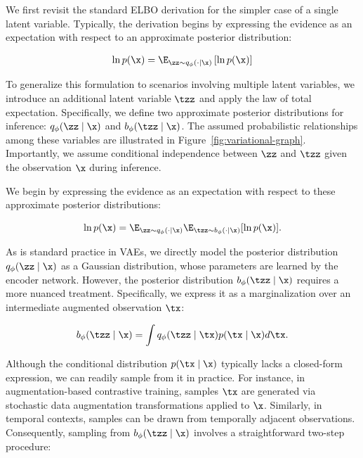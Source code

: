 We first revisit the standard ELBO derivation for the simpler case of a single latent variable. Typically, the derivation begins by expressing the evidence as an expectation with respect to an approximate posterior distribution:

\begin{equation}
    \begin{split}
        \ln{p(\x)}
        & =
        \E_{\zz \sim q_{\phi}(\cdot \mid \x)}
        \left[
            \ln p(\x)
            \right] \\
    \end{split}
\end{equation}

To generalize this formulation to scenarios involving multiple latent variables, we introduce an additional latent variable $\tzz$ and apply the law of total expectation. Specifically, we define two approximate posterior distributions for inference: $q_{\phi}(\zz \mid \x)$ and $b_{\phi}(\tzz \mid \x)$. The assumed probabilistic relationships among these variables are illustrated in Figure~\ref{fig:variational-graph}. Importantly, we assume conditional independence between $\zz$ and $\tzz$ given the observation $\x$ during inference.

We begin by expressing the evidence as an expectation with respect to these approximate posterior distributions:

\begin{equation}
    \ln{p(\x)} = \E_{\zz \sim q_{\phi}(\cdot \mid \x)} \E_{\tzz \sim b_{\phi}(\cdot \mid \x)} [\ln p(\x)].
\end{equation}

As is standard practice in VAEs, we directly model the posterior distribution $q_{\phi}(\zz \mid \x)$ as a Gaussian distribution, whose parameters are learned by the encoder network. However, the posterior distribution $b_{\phi}(\tzz \mid \x)$ requires a more nuanced treatment. Specifically, we express it as a marginalization over an intermediate augmented observation $\tx$:

\begin{equation}
    \label{eq:b_phi}
    b_{\phi}(\tzz \mid \x) = \int q_{\phi}(\tzz \mid \tx) p(\tx \mid \x) d\tx.
\end{equation}

Although the conditional distribution $p(\tx \mid \x)$ typically lacks a closed-form expression, we can readily sample from it in practice. For instance, in augmentation-based contrastive training, samples $\tx$ are generated via stochastic data augmentation transformations applied to $\x$. Similarly, in temporal contexts, samples can be drawn from temporally adjacent observations. Consequently, sampling from $b_{\phi}(\tzz \mid \x)$ involves a straightforward two-step procedure:

